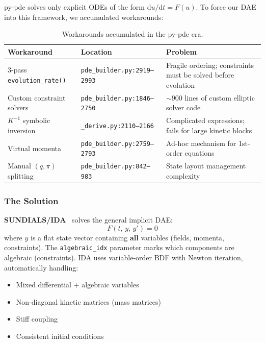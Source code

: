 py-pde solves only explicit ODEs of the form $\mathrm{d}u/\mathrm{d}t = F(u)$. To force our DAE
into this framework, we accumulated workarounds:

\begin{table}[htbp]
\centering
\caption{Workarounds accumulated in the py-pde era.}
\label{tab:workarounds}
\begin{tabular}{@{}lll@{}}
\toprule
Workaround & Location & Problem \\
\midrule
3-pass \texttt{evolution\_rate()} & \texttt{pde\_builder.py:2919--2993} & Fragile ordering; constraints must be solved before evolution \\
Custom constraint solvers & \texttt{pde\_builder.py:1846--2750} & $\sim$900 lines of custom elliptic solver code \\
$K^{-1}$ symbolic inversion & \texttt{\_derive.py:2110--2166} & Complicated expressions; fails for large kinetic blocks \\
Virtual momenta & \texttt{pde\_builder.py:2759--2793} & Ad-hoc mechanism for 1st-order equations \\
Manual $(q, \pi)$ splitting & \texttt{pde\_builder.py:842--983} & State layout management complexity \\
\bottomrule
\end{tabular}
\end{table}

\subsubsection{The Solution}
\label{sec:migration-solution}

\textbf{SUNDIALS/IDA}~\cite{hindmarsh2005sundials} solves the general implicit DAE:
\begin{equation}
  F(t,\, y,\, y') = 0
  \label{eq:dae-residual}
\end{equation}
where $y$ is a flat state vector containing \textbf{all} variables (fields, momenta,
constraints). The \texttt{algebraic\_idx} parameter marks which components are algebraic
(constraints). IDA uses variable-order BDF with Newton iteration, automatically
handling:

\begin{itemize}
  \item Mixed differential + algebraic variables
  \item Non-diagonal kinetic matrices (mass matrices)
  \item Stiff coupling
  \item Consistent initial conditions
\end{itemize}

